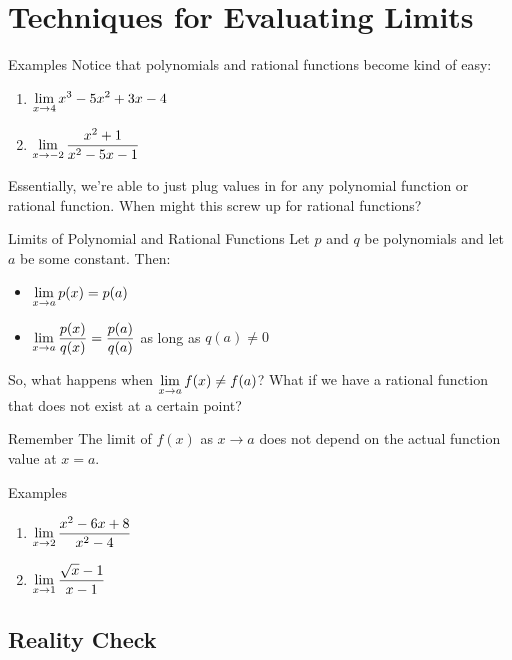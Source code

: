 \section{Techniques for Evaluating Limits}


\begin{note}{Examples}
Notice that polynomials and rational functions become kind of easy:
\begin{enumerate}
\item $\displaystyle \lim_{x\to 4}x^3-5x^2+3x-4$
\item $\displaystyle \lim_{x\to -2} \dfrac{x^2+1}{x^2-5x-1}$
\end{enumerate}
\end{note}

Essentially, we're able to just plug values in for any polynomial function or rational function. When might this screw up for rational functions?

\newpage
\begin{thm}{Limits of Polynomial and Rational Functions}
Let $p$ and $q$ be polynomials and let $a$ be some constant.
Then:

\begin{itemize}
\item $\displaystyle \lim_{x\to a} p(x) = p(a)$
\item $\displaystyle \lim_{x\to a} \dfrac{p(x)}{q(x)} = \dfrac{p(a)}{q(a)}$ as long as $q(a)\neq 0$
\end{itemize}
\end{thm}

So, what happens when $\displaystyle \lim_{x\to a} f(x) \neq f(a)$? What if we have a rational function that does not exist at a certain point?

\begin{note}{Remember}
The limit of $f(x)$ as $x\to a$ does not depend on the actual function value at $x=a$.
\end{note}

\begin{note}{Examples}
\begin{multicols}{2}
\begin{enumerate}
\item $\displaystyle \lim_{x\to2} \dfrac{x^2-6x+8}{x^2-4}$
\item $\displaystyle \lim_{x\to1} \dfrac{\sqrt{x}-1}{x-1}$
\end{enumerate}
\end{multicols}
\end{note}

\subsection*{Reality Check}

